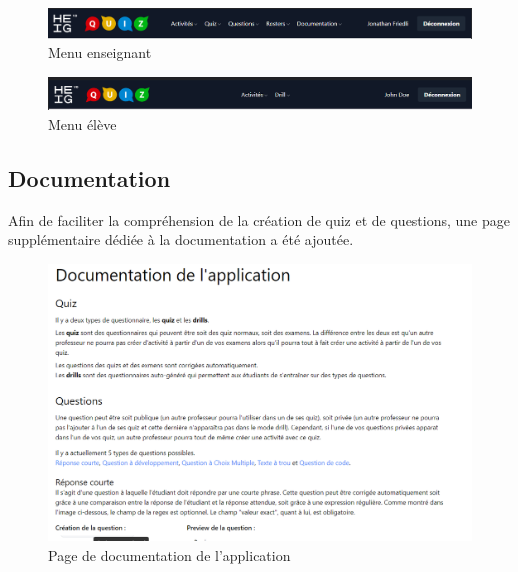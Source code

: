 \begin{center}
    \begin{figure}[H]
        \includegraphics[width=\textwidth]{./assets/figures/teacherNav.png}
        \caption{Menu enseignant}
    \end{figure}
\end{center}

\begin{center}
    \begin{figure}[H]
        \includegraphics[width=\textwidth]{./assets/figures/studentNav.png}
        \caption{Menu élève}
    \end{figure}
\end{center}

\subsection{Documentation}
Afin de faciliter la compréhension de la création de quiz et de questions, une page supplémentaire dédiée à la documentation a été ajoutée.

\begin{center}
    \begin{figure}[H]
        \includegraphics[width=\textwidth]{./assets/figures/documentation.png}
        \caption{Page de documentation de l'application}
    \end{figure}
\end{center}

